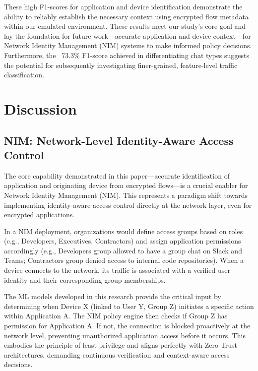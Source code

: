 \documentclass[conference]{IEEEtran}
\begin{document}
These high F1-scores for application and device identification demonstrate the ability to reliably establish the necessary context using encrypted flow metadata within our emulated environment. These results meet our study’s core goal and lay the foundation for future work—accurate application and device context—for Network Identity Management (NIM) systems to make informed policy decisions. Furthermore, the ~73.3\% F1-score achieved in differentiating chat types suggests the potential for subsequently investigating finer-grained, feature-level traffic classification.


\section{Discussion}
\subsection{NIM: Network-Level Identity-Aware Access Control}
The core capability demonstrated in this paper—accurate identification of application and originating device from encrypted flows—is a crucial enabler for Network Identity Management (NIM). This represents a paradigm shift towards implementing identity-aware access control directly at the network layer, even for encrypted applications.

In a NIM deployment, organizations would define access groups based on roles (e.g., Developers, Executives, Contractors) and assign application permissions accordingly (e.g., Developers group allowed to have a group chat on Slack and Teams; Contractors group denied access to internal code repositories). When a device connects to the network, its traffic is associated with a verified user identity and their corresponding group memberships.

The ML models developed in this research provide the critical input by determining when Device X (linked to User Y, Group Z) initiates a specific action within Application A. The NIM policy engine then checks if Group Z has permission for Application A. If not, the connection is blocked proactively at the network level, preventing unauthorized application access before it occurs. This embodies the principle of least privilege and aligns perfectly with Zero Trust architectures, demanding continuous verification and context-aware access decisions.
\end{document}
